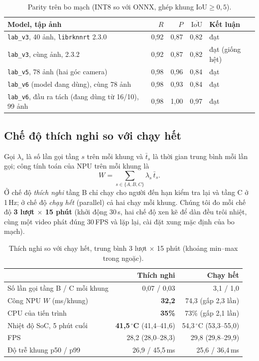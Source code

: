 \documentclass[12pt,a4paper]{article}
\begin{document}
\begin{table}[ht]
\centering
\caption{Parity trên bo mạch (INT8 so với ONNX, ghép khung $\mathrm{IoU}\ge0{,}5$).}
\label{tab:parity}
\begin{tabular}{lrrrl}
\toprule
Model, tập ảnh & $R$ & $P$ & $\overline{\mathrm{IoU}}$ & Kết luận \\
\midrule
\texttt{lab\_v3}, 40 ảnh, \texttt{librknnrt} 2.3.0 & 0,92 & 0,87 & 0,82 & đạt \\
\texttt{lab\_v3}, cùng ảnh, 2.3.2 & 0,92 & 0,87 & 0,82 & đạt (giống hệt) \\
\texttt{lab\_v5}, 78 ảnh (hai góc camera) & 0,98 & 0,96 & 0,84 & đạt \\
\texttt{lab\_v6} (model đang dùng), cùng 78 ảnh & 0,98 & 0,93 & 0,84 & đạt \\
\texttt{lab\_v6}, đầu ra tách (đang dùng từ 16/10), 99 ảnh & 0,98 & 1,00 & 0,97 & đạt \\
\bottomrule
\end{tabular}
\end{table}

\subsection{Chế độ thích nghi so với chạy hết}
\label{sec:adaptive}

Gọi $\lambda_s$ là số lần gọi tầng $s$ trên mỗi khung và $\bar t_s$ là thời gian trung bình mỗi lần gọi; công tính toán
của NPU trên mỗi khung là
\begin{equation}
  W=\sum_{s\in\{A,B,C\}}\lambda_s\,\bar t_s .
\end{equation}
Ở chế độ \emph{thích nghi} tầng B chỉ chạy cho người đến hạn kiểm tra lại và tầng C ở 1\,Hz; ở chế độ \emph{chạy hết}
(parallel) cả hai chạy mỗi khung. Chúng tôi đo mỗi chế độ \textbf{3 lượt $\times$ 15 phút} (khởi động 30\,s, hai chế độ xen
kẽ để dàn đều trôi nhiệt, cùng một video phát đúng 30\,FPS và lặp lại, cài đặt xung mặc định của bo mạch).

\begin{table}[ht]
\centering
\caption{Thích nghi so với chạy hết, trung bình 3 lượt $\times$ 15 phút (khoảng min--max trong ngoặc).}
\label{tab:adapt}
\begin{tabular}{lrr}
\toprule
 & Thích nghi & Chạy hết \\
\midrule
Số lần gọi tầng B / C mỗi khung & 0,07 / 0,03 & 3,1 / 1,0 \\
Công NPU $W$ (ms/khung) & \textbf{32,2} & 74,3 (gấp 2,3 lần) \\
CPU của tiến trình & \textbf{35\%} & 73\% (gấp 2,1 lần) \\
Nhiệt độ SoC, 5 phút cuối & \textbf{41,5\,$^\circ$C} (41,4--41,6) & 54,3\,$^\circ$C (53,3--55,0) \\
FPS & 28,2 (28,0--28,3) & 29,8 (29,8--29,9) \\
Độ trễ khung p50 / p99 & 26,9 / 45,5\,ms & 25,6 / 36,4\,ms \\
\bottomrule
\end{tabular}
\end{table}
\end{document}
